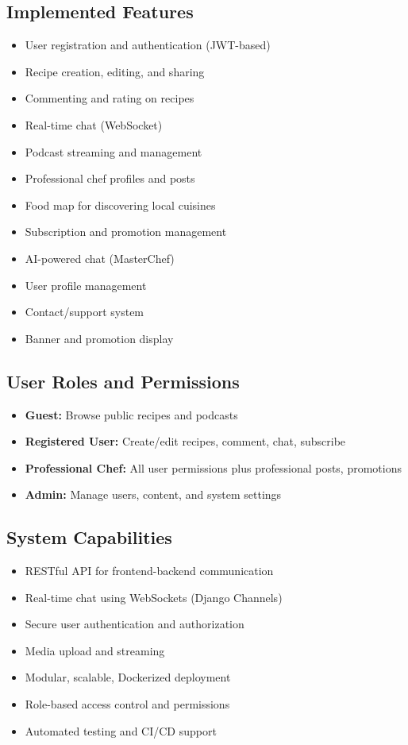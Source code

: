 \documentclass[conference]{IEEEtran}
\begin{document}
\subsection{Implemented Features}
\begin{itemize}
    \item User registration and authentication (JWT-based)
    \item Recipe creation, editing, and sharing
    \item Commenting and rating on recipes
    \item Real-time chat (WebSocket)
    \item Podcast streaming and management
    \item Professional chef profiles and posts
    \item Food map for discovering local cuisines
    \item Subscription and promotion management
    \item AI-powered chat (MasterChef)
    \item User profile management
    \item Contact/support system
    \item Banner and promotion display
\end{itemize}

\subsection{User Roles and Permissions}
\begin{itemize}
    \item \textbf{Guest:} Browse public recipes and podcasts
    \item \textbf{Registered User:} Create/edit recipes, comment, chat, subscribe
    \item \textbf{Professional Chef:} All user permissions plus professional posts, promotions
    \item \textbf{Admin:} Manage users, content, and system settings
\end{itemize}

\subsection{System Capabilities}
\begin{itemize}
    \item RESTful API for frontend-backend communication
    \item Real-time chat using WebSockets (Django Channels)
    \item Secure user authentication and authorization
    \item Media upload and streaming
    \item Modular, scalable, Dockerized deployment
    \item Role-based access control and permissions
    \item Automated testing and CI/CD support
\end{itemize}
\end{document}
